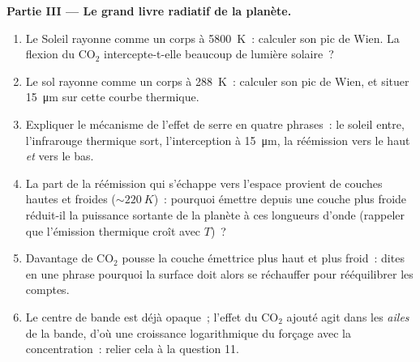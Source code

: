 \begin{problem}
\medskip\noindent\textbf{Partie III --- Le grand livre radiatif de la planète.}
\begin{enumerate}[resume]
  \item Le Soleil rayonne comme un corps à \qty{5800}{K}~: calculer
        son pic de Wien. La flexion du CO$_2$ intercepte-t-elle
        beaucoup de lumière solaire~?
  \item Le sol rayonne comme un corps à \qty{288}{K}~: calculer son
        pic de Wien, et situer \qty{15}{\micro m} sur cette courbe
        thermique.
  \item Expliquer le mécanisme de l'effet de serre en quatre phrases~:
        le soleil entre, l'infrarouge thermique sort, l'interception à
        \qty{15}{\micro m}, la réémission vers le haut \emph{et} vers
        le bas.
  \item La part de la réémission qui s'échappe vers l'espace provient
        de couches hautes et froides ($\sim\qty{220}{K}$)~: pourquoi
        émettre depuis une couche plus froide réduit-il la puissance
        sortante de la planète à ces longueurs d'onde (rappeler
        que l'émission thermique croît avec $T$)~?
  \item Davantage de CO$_2$ pousse la couche émettrice plus haut et
        plus froid~: dites en une phrase pourquoi la surface doit alors
        se réchauffer pour rééquilibrer les comptes.
  \item Le centre de bande est déjà opaque~; l'effet du CO$_2$ ajouté
        agit dans les \emph{ailes} de la bande, d'où une croissance
        logarithmique du forçage avec la concentration~: relier cela à
        la question 11.
\end{enumerate}


\end{problem}
